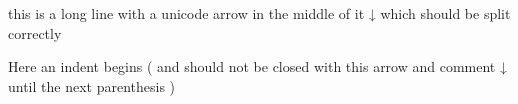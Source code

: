\documentclass{article}
\begin{document}
this is a long line with a unicode arrow in the middle of it ↓ which should be
split correctly

Here an indent begins (
  and should not be closed with this arrow and comment ↓%
  until the next parenthesis
)
\end{document}

